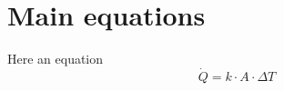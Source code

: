 \documentclass{article}
\begin{document}
\section*{Main equations}
Here an equation
\begin{equation}\label{eq:heatflux}
    \dot{Q} = k \cdot A \cdot \Delta T
\end{equation}%
%
%
\printnomenclature
\end{document}
